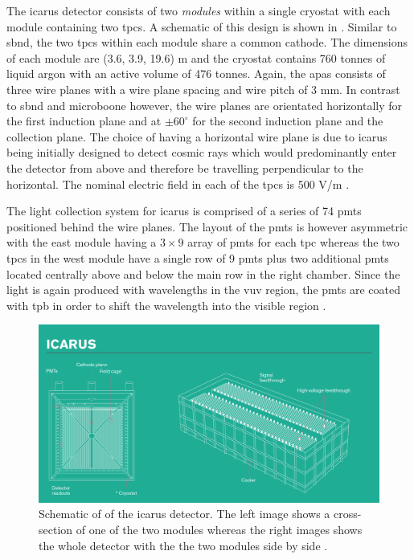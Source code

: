 The \gls{icarus} detector consists of two \textit{modules} within a single cryostat with each module containing two \glspl{tpc}. A schematic of this design is shown in . Similar to \gls{sbnd}, the two \glspl{tpc} within each module share a common cathode. The dimensions of each module are (3.6, 3.9, 19.6) m and the cryostat contains 760 tonnes of liquid argon with an active volume of 476 tonnes.  Again, the \glspl{apa} consists of three wire planes with a wire plane spacing and wire pitch of 3 mm. In contrast to \gls{sbnd} and \gls{microboone} however, the wire planes are orientated horizontally for the first induction plane and at $\pm 60^\circ$ for the second induction plane and the collection plane. The choice of having a horizontal wire plane is due to \gls{icarus} being initially designed to detect cosmic rays which would predominantly enter the detector from above and therefore be travelling perpendicular to the horizontal. The nominal electric field in each of the \glspl{tpc} is 500 V/m \cite{SBN_Proposal}. 

The light collection system for \gls{icarus} is comprised of a series of 74 \glspl{pmt} positioned behind the wire planes. The layout of the \glspl{pmt} is however asymmetric with the east module having a $3 \times 9$ array of \glspl{pmt} for each \gls{tpc} whereas the two \glspl{tpc} in the west module have a single row of 9 \glspl{pmt} plus two additional \glspl{pmt} located centrally above and below the main row in the right chamber. Since the light is again produced with wavelengths in the \gls{vuv} region, the \glspl{pmt} are coated with \gls{tpb} in order to shift the wavelength into the visible region \cite{SBN_Proposal}.  

\begin{figure}[h!]
    \centering
    \includegraphics[width = \largefigwidth]{figures-chap3/icarus.png}
    \caption[ICARUS detector.]{Schematic of of the \gls{icarus} detector. The left image shows a cross-section of one of the two modules whereas the right images shows the whole detector with the the two modules side by side \cite{ICARUS_image}.}
    \label{fig:icarus}
\end{figure}

